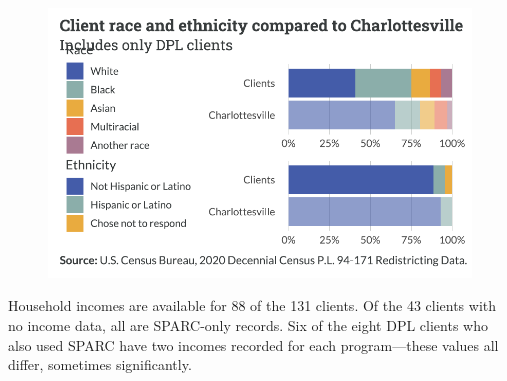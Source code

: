\documentclass[
  letterpaper,
  DIV=11,
  numbers=noendperiod]{scrartcl}
\begin{document}
\begin{figure}[H]

{\centering \includegraphics{piedmont_files/figure-pdf/race-ethnicity-1.pdf}

}

\end{figure}

Household incomes are available for 88 of the 131 clients. Of the 43
clients with no income data, all are SPARC-only records. Six of the
eight DPL clients who also used SPARC have two incomes recorded for each
program---these values all differ, sometimes significantly.
\end{document}
